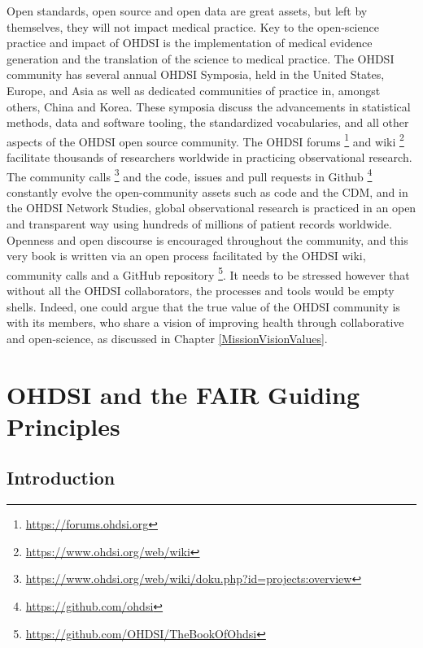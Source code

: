 \documentclass[11pt]{book}
\let\rmarkdownfootnote\footnote%
\def\footnote{\protect\rmarkdownfootnote}
\theoremstyle{definition}
\theoremstyle{definition}
\theoremstyle{definition}
\theoremstyle{remark}
\begin{document}

Open standards, open source and open data are great assets, but left by themselves, they will not impact medical practice. Key to the open-science practice and impact of OHDSI is the implementation of medical evidence generation and the translation of the science to medical practice. The OHDSI community has several annual OHDSI Symposia, held in the United States, Europe, and Asia as well as dedicated communities of practice in, amongst others, China and Korea. These symposia discuss the advancements in statistical methods, data and software tooling, the standardized vocabularies, and all other aspects of the OHDSI open source community. The OHDSI forums \footnote{\url{https://forums.ohdsi.org}} and wiki \footnote{\url{https://www.ohdsi.org/web/wiki}} facilitate thousands of researchers worldwide in practicing observational research. The community calls \footnote{\url{https://www.ohdsi.org/web/wiki/doku.php?id=projects:overview}} and the code, issues and pull requests in Github \footnote{\url{https://github.com/ohdsi}} constantly evolve the open-community assets such as code and the CDM, and in the OHDSI Network Studies, global observational research is practiced in an open and transparent way using hundreds of millions of patient records worldwide. Openness and open discourse is encouraged throughout the community, and this very book is written via an open process facilitated by the OHDSI wiki, community calls and a GitHub repository \footnote{\url{https://github.com/OHDSI/TheBookOfOhdsi}}. It needs to be stressed however that without all the OHDSI collaborators, the processes and tools would be empty shells. Indeed, one could argue that the true value of the OHDSI community is with its members, who share a vision of improving health through collaborative and open-science, as discussed in Chapter \ref{MissionVisionValues}.

\hypertarget{ohdsi-and-the-fair-guiding-principles}{%
\section{OHDSI and the FAIR Guiding Principles}\label{ohdsi-and-the-fair-guiding-principles}}


\hypertarget{introduction}{%
\subsection{Introduction}\label{introduction}}
\end{document}
